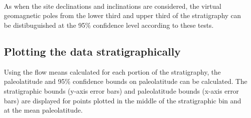 \documentclass{article}
\begin{document}
    \begin{center}
    \end{center}
    { \hspace*{\fill} \\}
    
    \begin{center}
    \end{center}
    { \hspace*{\fill} \\}
    
    \begin{center}
    \end{center}
    { \hspace*{\fill} \\}
    
    As when the site declinations and inclinations are considered, the
virtual geomagnetic poles from the lower third and upper third of the
stratigraphy can be distibuguished at the 95\% confidence level
according to these tests.


    \subsection{Plotting the data stratigraphically}


    Using the flow means calculated for each portion of the stratigraphy,
the paleolatitude and 95\% confidence bounds on paleolatitude can be
calculated. The stratigraphic bounds (y-axis error bars) and
paleolatitude bounds (x-axis error bars) are displayed for points
plotted in the middle of the stratigraphic bin and at the mean
paleolatitude.
\end{document}
